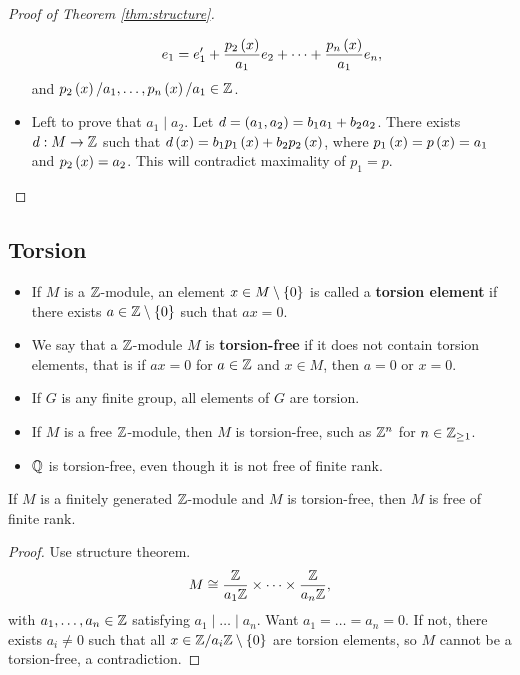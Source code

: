 \begin{proof}[Proof of Theorem \ref{thm:structure}]
\begin{itemize}
$$ e_1 = e_1' + \dfrac{p_2\left( x \right)}{a_1}e_2 + \dots + \dfrac{p_n\left( x \right)}{a_1}e_n, $$
and $ p_2\left( x \right) / a_1, \dots, p_n\left( x \right) / a_1 \in \mathbb{Z} $.
\item Left to prove that $ a_1 \mid a_2 $. Let $ d = \left( a_1, a_2 \right) = b_1a_1 + b_2a_2 $. There exists $ d : M \to \mathbb{Z} $ such that $ d\left( x \right) = b_1p_1\left( x \right) + b_2p_2\left( x \right) $, where $ p_1\left( x \right) = p\left( x \right) = a_1 $ and $ p_2\left( x \right) = a_2 $. This will contradict maximality of $ p_1 = p $.
\end{itemize}
\end{proof}

\pagebreak

\subsection{Torsion}


\begin{definition}
\hfill
\begin{itemize}
\item If $ M $ is a $ \mathbb{Z} $-module, an element $ x \in M \setminus \left\{ 0 \right\} $ is called a \textbf{torsion element} if there exists $ a \in \mathbb{Z} \setminus \left\{ 0 \right\} $ such that $ ax = 0 $.
\item We say that a $ \mathbb{Z} $-module $ M $ is \textbf{torsion-free} if it does not contain torsion elements, that is if $ ax = 0 $ for $ a \in \mathbb{Z} $ and $ x \in M $, then $ a = 0 $ or $ x = 0 $.
\end{itemize}
\end{definition}

\begin{example*}
\hfill
\begin{itemize}
\item If $ G $ is any finite group, all elements of $ G $ are torsion.
\item If $ M $ is a free $ \mathbb{Z} $-module, then $ M $ is torsion-free, such as $ \mathbb{Z}^n $ for $ n \in \mathbb{Z}_{\ge 1} $.
\item $ \mathbb{Q} $ is torsion-free, even though it is not free of finite rank.
\end{itemize}
\end{example*}

\begin{proposition}
If $ M $ is a finitely generated $ \mathbb{Z} $-module and $ M $ is torsion-free, then $ M $ is free of finite rank.
\end{proposition}

\begin{proof}
Use structure theorem.
$$ M \cong \dfrac{\mathbb{Z}}{a_1\mathbb{Z}} \times \dots \times \dfrac{\mathbb{Z}}{a_n\mathbb{Z}}, $$
with $ a_1, \dots, a_n \in \mathbb{Z} $ satisfying $ a_1 \mid \dots \mid a_n $. Want $ a_1 = \dots = a_n = 0 $. If not, there exists $ a_i \ne 0 $ such that all $ x \in \mathbb{Z} / a_i\mathbb{Z} \setminus \left\{ 0 \right\} $ are torsion elements, so $ M $ cannot be a torsion-free, a contradiction.
\end{proof}

